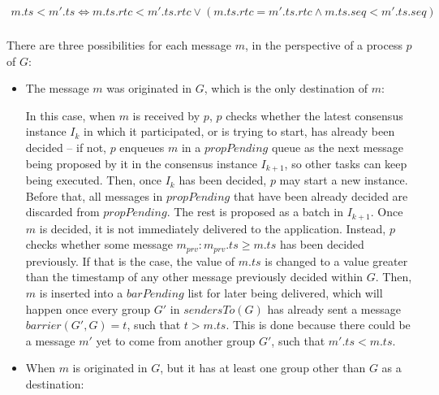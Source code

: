\documentclass[times, 10pt]{article}
\begin{document}
\begin{align*}
m.ts < m'.ts \Longleftrightarrow m.ts.rtc < m'.ts.rtc \vee (m.ts.rtc = m'.ts.rtc \wedge m.ts.seq < m'.ts.seq)\\
\end{align*}

There are three possibilities for each message $m$, in the perspective of a process $p$ of $G$:

\begin{itemize}
  \item The message $m$ was originated in $G$, which is the only destination of $m$:
  
  In this case, when $m$ is received by $p$, $p$ checks whether the latest consensus instance $I_{k}$ in which it participated, or is trying to start, has already been decided -- if not, $p$ enqueues $m$ in a $propPending$ queue as the next message being proposed by it in the consensus instance $I_{k+1}$, so other tasks can keep being executed. Then, once $I_{k}$ has been decided, $p$ may start a new instance. Before that, all messages in $propPending$ that have been already decided are discarded from $propPending$. The rest is proposed as a batch in $I_{k+1}$. Once $m$ is decided, it is not immediately delivered to the application. Instead, $p$ checks whether some message $m_{prv} : m_{prv}.ts \geq m.ts$ has been decided previously. If that is the case, the value of $m.ts$ is changed to a value greater than the timestamp of any other message previously decided within $G$. Then, $m$ is inserted into a $barPending$ list for later being delivered, which will happen once every group $G'$ in $sendersTo(G)$ has already sent a message $barrier(G',G) = t$, such that $t > m.ts$. This is done because there could be a message $m'$ yet to come from another group $G'$, such that $m'.ts < m.ts$.

  \item When $m$ is originated in $G$, but it has at least one group other than $G$ as a destination:
  

\end{itemize}
\end{document}
